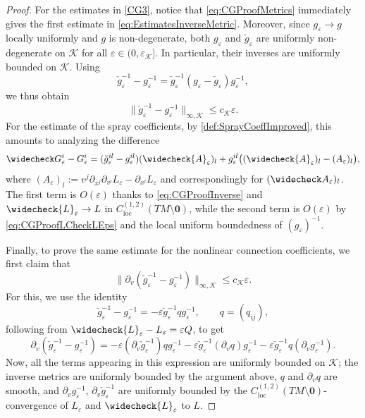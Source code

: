 \documentclass[a4paper,11pt]{article}
\numberwithin{equation}{section}
\theoremstyle{definition}
\theoremstyle{plain}
\newcommand{\eps}{\varepsilon}
\newcommand{\loc}{\mathrm{loc}}
\begin{document}
\begin{proof}
For the estimates in \ref{CG3}, notice that \eqref{eq:CGProofMetrics} immediately gives the first estimate in \eqref{eq:EstimatesInverseMetric}.
Moreover, since $g_\eps \rightarrow g$ locally uniformly and $g$ is non-degenerate, both $g_\eps$ and $\check g_\eps$ are uniformly non-degenerate on $\mathcal{K}$ for all $\eps \in (0,\eps_{\mathcal{K}}]$. 
In particular, their inverses are uniformly bounded on $\mathcal{K}$. 
Using
\begin{equation} \label{eq:matrixInversion}
    \check g_\eps^{-1}-g_\eps^{-1} = \check g_\eps^{-1}(g_\eps-\check g_\eps)g_\eps^{-1},
\end{equation}
we thus obtain
\begin{equation} \label{eq:CGProofInverse}
    \|\check g_\eps^{-1}-g_\eps^{-1}\|_{\infty,\mathcal{K}} \leq c_{\mathcal{K}}\eps.
\end{equation}
For the estimate of the spray coefficients, by \eqref{def:SprayCoeffImproved}, this amounts to analyzing the difference
\begin{equation}
\label{eq:G_eps}
    \widecheck G_\eps^i -G_\eps^i =( \check g_\eps^{il}-g_\eps^{il})
    (\widecheck{A}_\eps)_l + g_\eps^{il}\bigl( (\widecheck{A}_\eps)_l - (A_\eps)_l \bigr),
\end{equation} 
where $(A_\eps)_l := v^j \partial_{x^j} \partial_{v^l} L_\eps - \partial_{x^l} L_\eps$ and correspondingly for $(\widecheck A_\eps)_l$.
The first term is $O(\eps)$ thanks to \eqref{eq:CGProofInverse} and $\widecheck{L}_\eps \rightarrow L$ in $C^{(1,2)}_\loc(TM \setminus \mathbf{0})$, while the second term is $O(\eps)$ by \eqref{eq:CGProofLCheckLEps} and the local uniform boundedness of $(g_\eps)^{-1}$. 

Finally, to prove the same estimate for the nonlinear connection coefficients, we first claim that
\begin{equation*}
    \| \partial_v (\check g_\eps^{-1}-g_\eps^{-1}) \|_{\infty,\mathcal K}\leq c_{\mathcal K}\eps.
\end{equation*}
For this, we use the identity
\begin{equation*}
    \check g_\eps^{-1}-g_\eps^{-1}
    = -\eps \check g_\eps^{-1} q g_\eps^{-1}, \qquad q=(q_{ij}), 
\end{equation*}
following from $\widecheck{L}_\eps -L_\eps = \eps Q$, to get
\begin{equation*}
    \partial_{v}
    (\check g_\eps^{-1}-g_\eps^{-1}) 
    = -\eps (\partial_{v}\check g_\eps^{-1}) qg_\eps^{-1} 
    -\eps \check g_\eps^{-1}(\partial_{v}q)g_\eps^{-1}
    -\eps \check g_\eps^{-1}q(\partial_{v}g_\eps^{-1}).
\end{equation*}
Now, all the terms appearing in this expression are uniformly bounded on $\mathcal K$; the inverse metrics are uniformly bounded by the argument above, $q$ and $\partial_v q$ are smooth, and $\partial_v g_\eps^{-1}$, $\partial_v \check g_\eps^{-1}$ are uniformly bounded by the $C^{(1,2)}_{\mathrm{loc}}(TM \setminus \mathbf{0})$-convergence of $L_\eps$ and $\widecheck{L}_\eps$ to $L$.


\end{proof}
\end{document}
